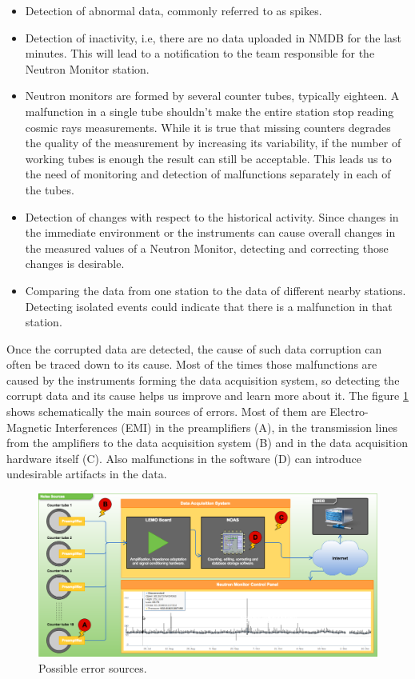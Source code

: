 \documentclass[a4paper]{jpconf}
\begin{document}
\begin{itemize}
	\item Detection of abnormal data, commonly referred to as spikes.
    \item Detection of inactivity, i.e, there are no data uploaded in NMDB for
        the last minutes. This will lead to a notification to the team
        responsible for the Neutron Monitor station. 
    \item Neutron monitors are formed by several counter tubes, typically
        eighteen. A malfunction in a single tube shouldn't make the entire
        station stop reading cosmic rays measurements. While it is true that
        missing counters degrades the quality of the measurement by increasing its
        variability, if the number of working tubes is enough the result can
        still be acceptable. This leads us to the need of monitoring and
        detection of malfunctions separately in each of the tubes.  
    \item Detection of changes with respect to the historical activity.
        Since changes in the immediate environment or the instruments can cause
        overall changes in the measured values of a Neutron Monitor, detecting
        and correcting those changes is desirable.
    \item Comparing the data from one station to the data of different nearby
        stations. Detecting isolated events could indicate that there is a
        malfunction in that station.	
\end{itemize}

Once the corrupted data are detected, the cause of such data corruption can
often be traced down to its cause. Most of the times those malfunctions are
caused by the instruments forming the data acquisition system, so detecting the
corrupt data and its cause helps us improve and learn more about it. The figure
\ref{fig:NoisePoints} shows schematically the main sources of errors. Most of
them are Electro-Magnetic Interferences (EMI) in the preamplifiers (A), in the
transmission lines from the amplifiers to the data acquisition system (B) and in
the data acquisition hardware itself (C). Also malfunctions in the software (D)
can introduce undesirable artifacts in the data.

\begin{figure}[ht]
    \centering
    \includegraphics[keepaspectratio, width=1\textwidth]{./resources/NoisePoints.png}
    \caption{Possible error sources.}
    \label{fig:NoisePoints}
\end{figure}
\end{document}
